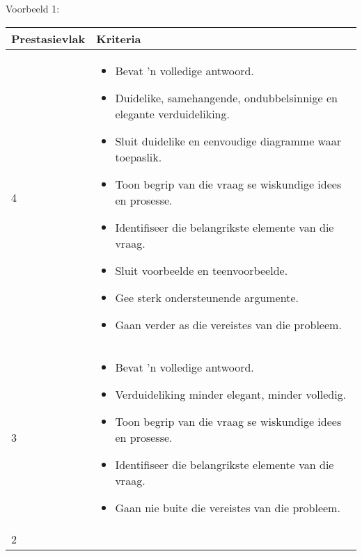 Voorbeeld 1:
\begin{table}[H]
 \begin{center}
  \begin{tabular}{|p{3cm}|p{8.5cm}|} \hline
\textbf{Prestasievlak}& \textbf{Kriteria} \\ \hline
4 &
\begin{itemize}[noitemsep]
\item
  Bevat 'n volledige antwoord.
\item
  Duidelike, samehangende, ondubbelsinnige en elegante verduideliking.
\item
  Sluit duidelike en eenvoudige diagramme waar toepaslik.
\item
  Toon begrip van die vraag se wiskundige idees en prosesse.
\item
  Identifiseer die belangrikste elemente van die vraag.
\item
  Sluit voorbeelde en teenvoorbeelde.
\item
  Gee sterk ondersteunende argumente.
\item
  Gaan verder as die vereistes van die probleem.
   \end{itemize} \\ \hline
3 & 
\begin{itemize}[noitemsep]
\item
  Bevat 'n volledige antwoord.
\item
  Verduideliking minder elegant, minder volledig.
\item
  Toon begrip van die vraag se wiskundige idees en prosesse.
\item
  Identifiseer die belangrikste elemente van die vraag.
\item
  Gaan nie buite die vereistes van die probleem.
\end{itemize} \\ \hline
2 &
\begin{itemize}[noitemsep]

\end{itemize}
\end{tabular}
\end{center}
\end{table}
